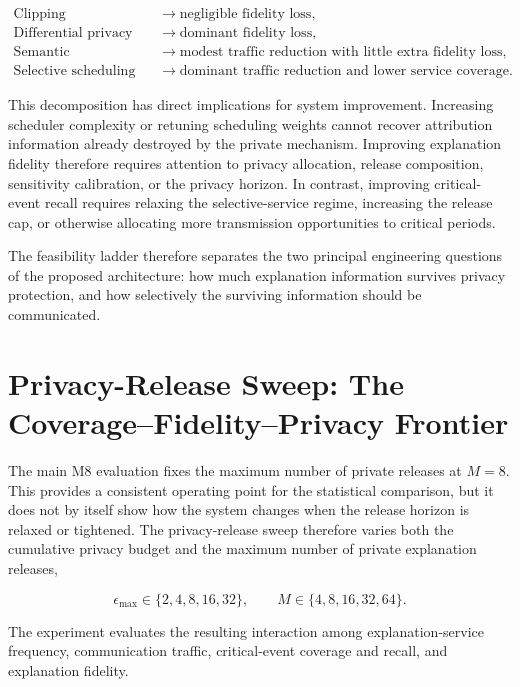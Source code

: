\documentclass[11pt]{article}
\begin{document}
$$
\boxed{
\begin{array}{ll}
\text{Clipping} & \rightarrow \text{negligible fidelity loss},\\[1mm]
\text{Differential privacy} & \rightarrow \text{dominant fidelity loss},\\[1mm]
\text{Semantic compression} & \rightarrow \text{modest traffic reduction with little extra fidelity loss},\\[1mm]
\text{Selective scheduling} & \rightarrow \text{dominant traffic reduction and lower service coverage}.
\end{array}}
$$

This decomposition has direct implications for system improvement. Increasing scheduler complexity or retuning scheduling weights cannot recover attribution information already destroyed by the private mechanism. Improving explanation fidelity therefore requires attention to privacy allocation, release composition, sensitivity calibration, or the privacy horizon. In contrast, improving critical-event recall requires relaxing the selective-service regime, increasing the release cap, or otherwise allocating more transmission opportunities to critical periods.

The feasibility ladder therefore separates the two principal engineering questions of the proposed architecture: how much explanation information survives privacy protection, and how selectively the surviving information should be communicated.


\section{Privacy-Release Sweep: The Coverage--Fidelity--Privacy Frontier}\label{sec:privacy-release-frontier}

The main M8 evaluation fixes the maximum number of private releases at \(M=8\). This provides a consistent operating point for the statistical comparison, but it does not by itself show how the system changes when the release horizon is relaxed or tightened. The privacy-release sweep therefore varies both the cumulative privacy budget and the maximum number of private explanation releases,

$$
\epsilon_{\max}\in\{2,4,8,16,32\},
\qquad
M\in\{4,8,16,32,64\}.
$$

The experiment evaluates the resulting interaction among explanation-service frequency, communication traffic, critical-event coverage and recall, and explanation fidelity.
\end{document}

